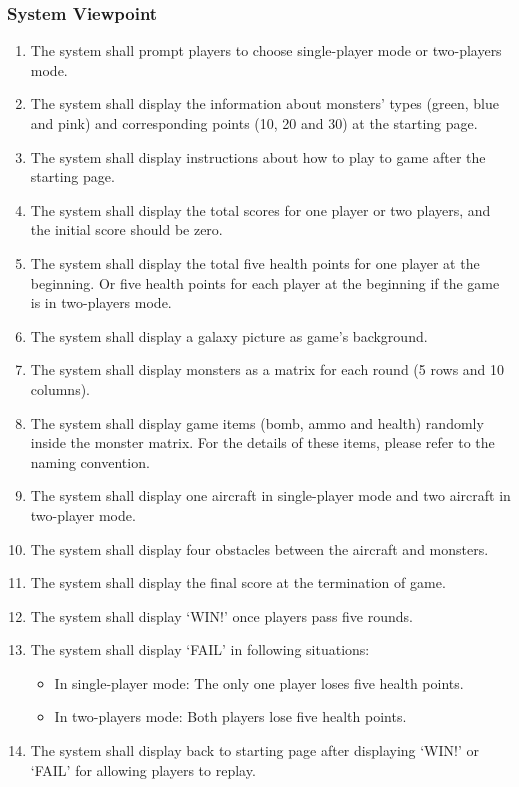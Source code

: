 \documentclass[12pt]{article}
\begin{document}
\subsubsection{System Viewpoint}
\begin{enumerate}[{FR}1:] 
\item The system shall prompt players to choose single-player
mode or two-players mode.
\item The system shall display the information about monsters’
types (green, blue and pink) and corresponding points (10, 20
and 30) at the starting page.
\item The system shall display instructions about how to 
play to game after the starting page.
\item The system shall display the total scores for one player
or two players, and the initial score should be zero.
\item The system shall display the total five health points for one player at the beginning. Or five health points for each player at the beginning if the game is in two-players mode.
\item The system shall display a galaxy picture as game’s background.
\item The system shall display monsters as a matrix for each round (5 rows and 10 columns).
\item The system shall display game items (bomb, ammo and health) randomly inside the monster matrix. For the details 
of these items, please refer to the naming convention.
\item The system shall display one aircraft in single-player mode and two aircraft in two-player mode.
\item The system shall display four obstacles between the aircraft and monsters.
\item The system shall display the final score at the termination of game.
\item The system shall display ‘WIN!’ once players pass five rounds.
\item The system shall display ‘FAIL’ in following situations:
\begin{itemize}
\item In single-player mode: The only one player loses five health points.
\item In two-players mode: Both players lose five health points. 
\end{itemize}
\item The system shall display back to starting page after displaying ‘WIN!’ or ‘FAIL’ for allowing players to replay.

\end{enumerate}
\end{document}
